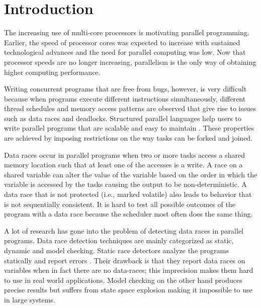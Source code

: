 \section{Introduction}
The increasing use of multi-core processors is motivating parallel programming. Earlier, the speed of processor cores was expected to increase with sustained technological advances and the need for parallel computing was low. Now that processor speeds are no longer increasing, parallelism is the only way of obtaining higher computing performance.

Writing concurrent programs that are free from bugs, however, is very difficult because when programs execute different instructions simultaneously, different thread schedules and memory access patterns are observed that give rise to issues such as data races and deadlocks. Structured parallel languages help users to write parallel programs that are scalable and easy to maintain \cite{blumofe1996cilk, charles2005x10, cave2011habanero}. These properties are achieved by imposing restrictions on the way tasks can be forked and joined.

Data races occur in parallel programs when two or more tasks access a shared memory location such that at least one of the accesses is a write. A race on a shared variable can alter the value of the variable based on the order in which the variable is accessed by the tasks causing the output to be non-deterministic. A data race that is not protected (i.e., marked volatile) also leads to behavior that is not sequentially consistent. It is hard to test all possible outcomes of the program with a data race because the scheduler most often does the same thing. 

A lot of research has gone into the problem of detecting data races in parallel programs. Data race detection techniques are mainly categorized as static, dynamic and model checking. Static race detectors analyze the programs statically and report errors \cite{engler2003racerx,ESC,abadi2006types,naik2006effective,voung2007relay,choi2001static, vechev2011automatic}. Their drawback is that they report data races on variables when in fact there are no data-races; this imprecision makes them hard to use in real world applications. Model checking on the other hand produces precise results but suffers from state space explosion making it impossible to use in large systems\cite{kulikov2010detecting, vakkalanka2008implementing, Godefroid, anderson2014jpf, gligoric2012x10x, zirkel2013automated}.

